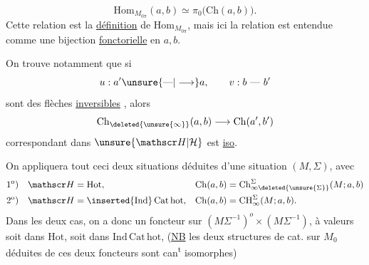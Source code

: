 \[
\mathrm{Hom}_{M_{0\pi}}(a,b)\simeq\pi_0\bigl(\mathrm{Ch}(a,b)\bigr).
\]
 Cette relation est la \uline{définition} de $\mathrm{Hom}_{M_{0\pi}}$, mais ici la relation est entendue comme une bijection \uline{fonctorielle} en $a,b$.

On trouve notamment que si
\[
u:a'\unsure{\text{---}|\longrightarrow}a,\qquad v:b\ \text{---}\ b'
\]
sont des flèches \uline{inversibles} , alors
\[
\mathrm{Ch}_{\deleted{\unsure{\infty}}}(a,b)\longrightarrow\mathrm{Ch}(a',b')
\]
correspondant dans $\unsure{\mathscr H|\mathcal H}$ est \uline{iso}.

On appliquera tout ceci   deux situations déduites d'une situation $(M,\Sigma)$, avec
\[
\begin{aligned}
1^{\mathrm o})\quad &\mathscr H=\mathrm{Hot},&
 \mathrm{Ch}(a,b)&=\mathrm{Ch}^{\Sigma}_{\infty\deleted{\unsure{\Sigma}}}(M;a,b)\\
2^{\mathrm o})\quad &\mathscr H=\inserted{\mathrm{Ind}}\,\mathrm{Cat}\,\mathrm{hot},&
 \mathrm{Ch}(a,b)&=\mathrm{CH}^{\Sigma}_{\infty}(M;a,b).
\end{aligned}
\]
Dans les deux cas, on a donc  un foncteur sur $(M\Sigma^{-1})^{o}\times(M\Sigma^{-1})$, à valeurs soit dans $\mathrm{Hot}$, soit dans  $\mathrm{Ind}\,\mathrm{Cat}\,\mathrm{hot}$, (\uline{NB} les deux structures de cat. sur $M_0$ déduites de ces deux foncteurs sont can\textsuperscript{t} isomorphes)

